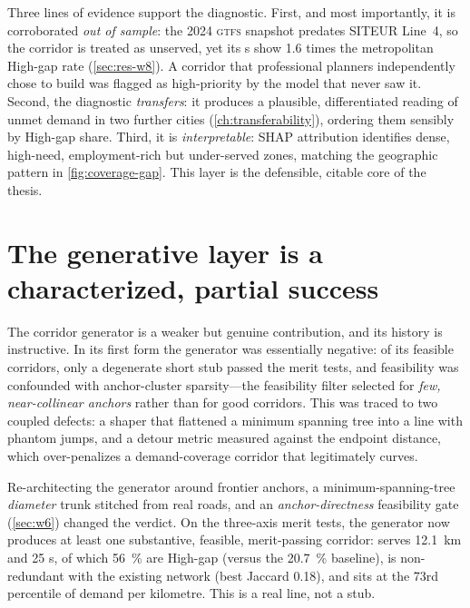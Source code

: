 Three lines of evidence support the diagnostic. First, and most importantly, it is
corroborated \emph{out of sample}: the 2024 \textsc{gtfs} snapshot predates SITEUR
Line~4, so the corridor is treated as unserved, yet its \ageb{}s show \num{1.6} times
the metropolitan High-gap rate (\cref{sec:res-w8}). A corridor that professional
planners independently chose to build was flagged as high-priority by the model that
never saw it. Second, the diagnostic \emph{transfers}: it produces a plausible,
differentiated reading of unmet demand in two further cities (\cref{ch:transferability}),
ordering them sensibly by High-gap share. Third, it is \emph{interpretable}: SHAP
attribution identifies dense, high-need, employment-rich but under-served zones,
matching the geographic pattern in \cref{fig:coverage-gap}. This layer is the
defensible, citable core of the thesis.

\section{The generative layer is a characterized, partial success}
\label{sec:disc-generative}

The corridor generator is a weaker but genuine contribution, and its history is
instructive. In its first form the generator was essentially negative: of its feasible
corridors, only a degenerate short stub passed the merit tests, and feasibility was
confounded with anchor-cluster sparsity---the feasibility filter selected for
\emph{few, near-collinear anchors} rather than for good corridors. This was traced to
two coupled defects: a shaper that flattened a minimum spanning tree into a line with
phantom jumps, and a detour metric measured against the endpoint distance, which
over-penalizes a demand-coverage corridor that legitimately curves.

Re-architecting the generator around frontier anchors, a minimum-spanning-tree
\emph{diameter} trunk stitched from real roads, and an \emph{anchor-directness}
feasibility gate (\cref{sec:w6}) changed the verdict. On the three-axis merit tests, the
generator now produces at least one substantive, feasible, merit-passing corridor:
 serves \SI{12.1}{\kilo\metre} and \num{25} \ageb{}s, of which
\SI{56}{\percent} are High-gap (versus the \SI{20.7}{\percent} baseline), is
non-redundant with the existing network (best Jaccard \num{0.18}), and sits at the
\num{73}rd percentile of demand per kilometre. This is a real line, not a stub.

